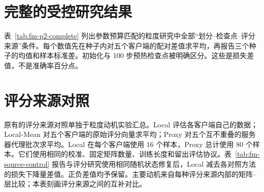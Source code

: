 \section{完整的受控研究结果}
\label{app:fm-p2-details}
表~\ref{tab:fm-p2-complete} 列出参数预算匹配的粒度研究中全部“划分--检查点--评分来源”条件。每个数值先在种子内对五个客户端的配对差值求平均，再报告三个种子的均值和样本标准差。初始化与 100 步预热检查点被明确区分。这些是损失差值，不是准确率百分点。


\section{评分来源对照}
\label{app:fm-source-control}
原有的评分来源对照单独于粒度动机实验汇总。Local 评估各客户端自己的数据；Local-Mean 对五个客户端的原始评分向量求平均；Proxy 对五个互不重叠的服务器代理批次求平均。Local 在每个客户端使用 16 个样本，Proxy 总计使用 80 个样本。它们使用相同的校准、固定矩阵数量、训练长度和留出评估协议。表~\ref{tab:fm-source-control} 报告与评分研究使用相同随机状态修复后，Local 减去各对照方法的损失下降量差值。正负差值均予保留。主要动机来自每种评分来源内部的矩阵--层比较；本表刻画评分来源之间的互补对比。

